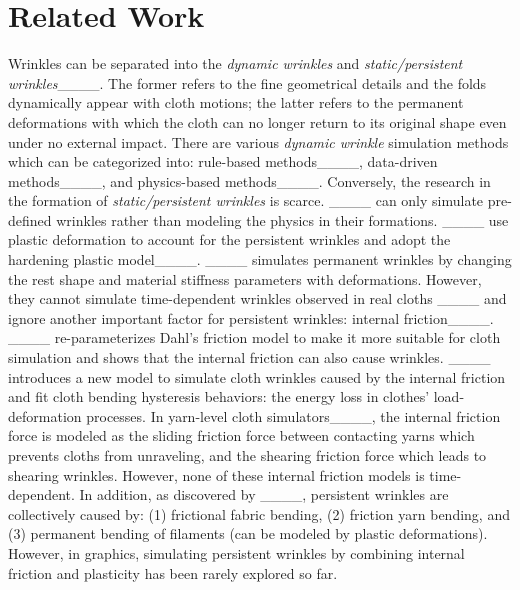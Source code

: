 \section{Related Work}
Wrinkles can be separated into the \textit{dynamic wrinkles} and \textit{static/persistent wrinkles}____. The former refers to the fine geometrical details and the folds dynamically appear with cloth motions; the latter refers to the permanent deformations with which the cloth can no longer return to its original shape even under no external impact. There are various \textit{dynamic wrinkle} simulation methods which can be categorized into: rule-based methods____, data-driven methods____, and physics-based methods____. Conversely, the research in the formation of \textit{static/persistent wrinkles} is scarce. ____ can only simulate pre-defined wrinkles rather than modeling the physics in their formations. ____ use plastic deformation to account for the persistent wrinkles and adopt the hardening plastic model____. ____ simulates permanent wrinkles by changing the rest shape and material stiffness parameters with deformations. However, they cannot simulate time-dependent wrinkles observed in real cloths ____ and ignore another important factor for persistent wrinkles: internal friction____. ____ re-parameterizes Dahl's friction model to make it more suitable for cloth simulation and shows that the internal friction can also cause wrinkles. ____ introduces a new model to simulate cloth wrinkles caused by the internal friction and fit cloth bending hysteresis behaviors: the energy loss in clothes' load-deformation processes. In yarn-level cloth simulators____, the internal friction force is modeled as the sliding friction force between contacting yarns which prevents cloths from unraveling, and the shearing friction force which leads to shearing wrinkles. However, none of these internal friction models is time-dependent. In addition, as discovered by ____, persistent wrinkles are collectively caused by: (1) frictional fabric bending, (2) friction yarn bending, and (3) permanent bending of filaments (can be modeled by plastic deformations). However, in graphics, simulating persistent wrinkles by combining internal friction and plasticity has been rarely explored so far.


